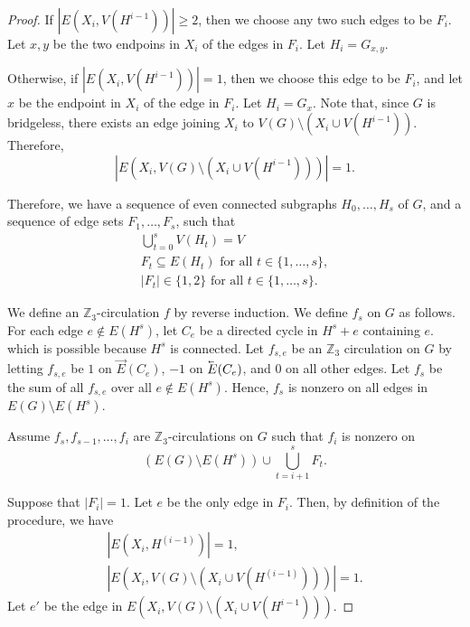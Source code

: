 \begin{proof}
	If \(|E(X_i, V(H^{i-1}))| \geq 2\), 
	then we choose any two such edges to be \(F_i\).
	Let \(x, y\) be the two endpoins in \(X_i\) of the edges in \(F_i\).
	Let \(H_i = G_{x, y}\).

	Otherwise, if \(|E(X_i, V(H^{i-1}))| = 1\),
	then we choose this edge to be \(F_i\),
	and let \(x\) be the endpoint in \(X_i\) of the edge in \(F_i\).
	Let \(H_i = G_{x}\).
	Note that, since \(G\) is bridgeless,
	there exists an edge joining \(X_i\) to \(V(G) \setminus (X_i \cup V(H^{i-1}))\).
	Therefore,
	\begin{equation}
		|E(X_i, V(G) \setminus (X_i \cup V(H^{i-1})))| = 1.
	\end{equation}

	Therefore,
	we have a sequence of even connected subgraphs \(H_0, \dots, H_s\) of \(G\),
	and a sequence of edge sets \(F_1, \dots, F_s\),
	such that
	\begin{gather}
		\bigcup_{t = 0}^{s} V(H_t) = V \\
		F_t \subseteq E(H_t) \text{ for all } t \in \{1, \dots, s\}, \\
		|F_t| \in \{1, 2\} \text{ for all } t \in \{1, \dots, s\}.
	\end{gather}

	We define an \(\mathbb{Z}_3\)-circulation \(f\) by reverse induction.
	We define \(f_s\) on \(G\) as follows.
	For each edge \(e \notin E(H^{s})\),
	let \(C_e\) be a directed cycle in \(H^{s} + e\) containing \(e\).
	which is possible because \(H^{s}\) is connected.
	Let \(f_{s, e}\) be an \(\mathbb{Z}_3\) circulation on \(G\) by letting \(f_{s, e}\) be \(1\) on \(\vec{E}(C_e)\), \(-1\) on \(\cev{E}(C_e)\), and \(0\) on all other edges.
	Let \(f_s\) be the sum of all \(f_{s, e}\) over all \(e \notin E(H^{s})\).
	Hence, \(f_s\) is nonzero on all edges in \(E(G) \setminus E(H^{s})\).

	Assume \(f_s, f_{s-1}, \dots, f_{i}\) are \(\mathbb{Z}_3\)-circulations on \(G\) such that \(f_i\) is nonzero on
	\begin{equation}
		(E(G) \setminus E(H^{s})) \cup \bigcup_{t = i+1}^{s} F_t.
	\end{equation}

	Suppose that \(|F_i| = 1\).
	Let \(e\) be the only edge in \(F_i\).
	Then, by definition of the procedure, we have
	\begin{gather}
		|E(X_i, H^{(i-1)})| = 1, \\
		|E(X_i, V(G) \setminus (X_i \cup V(H^{(i-1)})))| = 1.
	\end{gather}
	Let \(e'\) be the edge in \(E(X_i, V(G) \setminus (X_i \cup V(H^{i-1})))\).


\end{proof}
